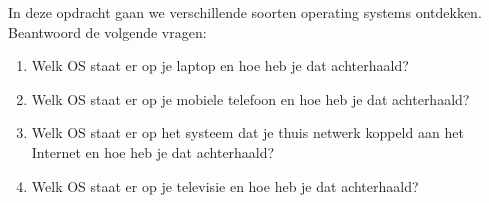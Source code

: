 In deze opdracht gaan we verschillende soorten operating systems ontdekken. Beantwoord de volgende vragen:
\begin{enumerate}
\item Welk OS staat er op je laptop en hoe heb je dat achterhaald?
\item Welk OS staat er op je mobiele telefoon en hoe heb je dat achterhaald?
\item Welk OS staat er op het systeem dat je thuis netwerk koppeld aan het Internet en hoe heb je dat achterhaald?
\item Welk OS staat er op je televisie en hoe heb je dat achterhaald?
\end{enumerate}

